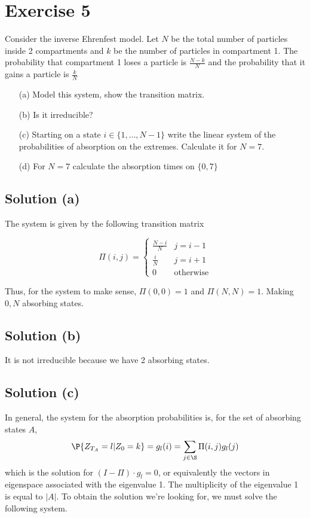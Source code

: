 \section*{Exercise 5}

Consider the inverse Ehrenfest model. Let $N$ be the total number of particles inside 2 compartments and $k$ be the number of particles in compartment 1. The probability that compartment 1 loses a particle is $\frac{N-k}{N}$ and the probability that it gains a particle is $\frac{k}{N}$ 

\begin{enumerate}
    \item[(a)] Model this system, show the transition matrix.
    \item[(b)] Is it irreducible?
    \item[(c)] Starting on a state $i\in \{1,\ldots, N-1\}$ write the linear system of the probabilities of absorption on the extremes. Calculate it for $N = 7$.
    \item[(d)] For $N = 7$ calculate the absorption times on $\{0,7\}$  
\end{enumerate}

\subsection*{Solution (a)}

The system is given by the following transition matrix

\[ \Pi(i,j) = \begin{cases}
    \frac{N-i}{N} & j = i-1\\
    \frac{i}{N} & j = i+1\\
    0 & \mbox{otherwise}
\end{cases} \]

Thus, for the system to make sense, $\Pi(0,0) = 1$ and $\Pi(N,N) = 1$. Making $0, N$ absorbing states.

\subsection*{Solution (b)}

It is not irreducible because we have 2 absorbing states.

\subsection*{Solution (c)}
In general, the system for the absorption probabilities is, for the set of absorbing states $A$,
\[ \P\{Z_{T_A} = l | Z_0 = k\} = g_l(i) = \sum_{j\in\S} \Pi(i,j) g_l(j) \]
which is the solution for $(I-\Pi)\cdot g_l = 0$, or equivalently the vectors in eigenspace associated with the eigenvalue 1. The multiplicity of the eigenvalue 1 is equal to $|A|$. To obtain the solution we're looking for, we must solve the following system.


